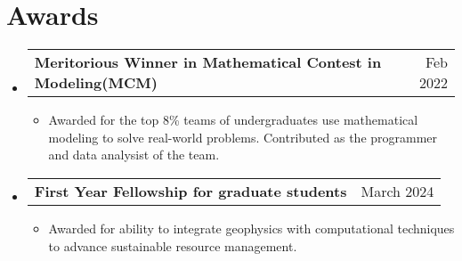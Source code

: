 \documentclass[letterpaper,13pt]{article}
\makeatletter
\newcommand{\resumeItem}[1]{
  \item\small{
    {#1 \vspace{-2pt}}
  }
}
\newcommand{\resumeProjectHeading}[2]{
    \item
    \begin{tabular*}{0.97\textwidth}{l@{\extracolsep{\fill}}r}
      \small#1 & #2 \\
    \end{tabular*}\vspace{-7pt}
}
\newcommand{\resumeSubHeadingListStart}{\begin{itemize}[leftmargin=0.15in, label={}]}
\newcommand{\resumeSubHeadingListEnd}{\end{itemize}}
\newcommand{\resumeItemListStart}{\begin{itemize}}
\newcommand{\resumeItemListEnd}{\end{itemize}\vspace{-5pt}}
\makeatother
\begin{document}
\section{Awards}
 \resumeSubHeadingListStart

 \resumeProjectHeading
{\textbf{Meritorious Winner in Mathematical Contest in Modeling(MCM)}}{Feb 2022}
\resumeItemListStart
	\resumeItem{Awarded for the top 8\% teams of undergraduates use mathematical modeling to solve real-world problems. Contributed as the programmer and data analysist of the team.}
\resumeItemListEnd

	\resumeProjectHeading
{\textbf{First Year Fellowship for graduate students}}{March 2024}
\resumeItemListStart
	\resumeItem{Awarded for ability to integrate geophysics with computational techniques to advance sustainable resource management.}
\resumeItemListEnd
\resumeSubHeadingListEnd
\end{document}
